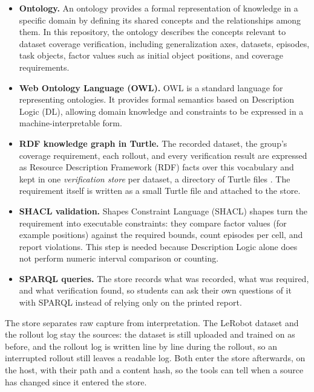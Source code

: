 \documentclass[11pt]{article}
\begin{document}
\begin{itemize}
  \item \textbf{Ontology.} An ontology \cite{guarino2009ontology} provides a formal representation of knowledge in a specific domain by defining its shared concepts and the relationships among them. In this repository, the ontology describes the concepts relevant to dataset coverage verification, including generalization axes, datasets, episodes, task objects, factor values such as initial object positions, and coverage requirements.
  \item \textbf{Web Ontology Language (OWL).} OWL \cite{w3c2012owl} is a standard language for representing ontologies. It provides formal semantics based on Description Logic (DL), allowing domain knowledge and constraints to be expressed in a machine-interpretable form.
  \item \textbf{RDF knowledge graph in Turtle.} The recorded dataset, the group's coverage requirement, each rollout,
        and every verification result are expressed as Resource Description Framework (RDF) facts over this vocabulary
        and kept in one \emph{verification store} per dataset, a directory of Turtle files \cite{w3cTurtle}. The
        requirement itself is written as a small Turtle file and attached to the store.
  \item \textbf{SHACL validation.} Shapes Constraint Language (SHACL) shapes \cite{w3cShacl} turn the requirement into executable constraints: they
        compare factor values (for example positions) against the required bounds, count episodes per cell, and report violations. This step is needed
        because Description Logic alone does not perform numeric interval comparison or counting.
  \item \textbf{SPARQL queries.} The store records what was recorded, what was required, and what verification found,
        so students can ask their own questions of it with SPARQL instead of relying only on the
        printed report.
\end{itemize}

The store separates raw capture from interpretation. The LeRobot dataset and the rollout log stay the sources: the
dataset is still uploaded and trained on as before, and the rollout log is written line by line during the rollout,
so an interrupted rollout still leaves a readable log. Both enter the store afterwards, on the host, with their path and a
content hash, so the tools can tell when a source has changed since it entered the store.
\end{document}
